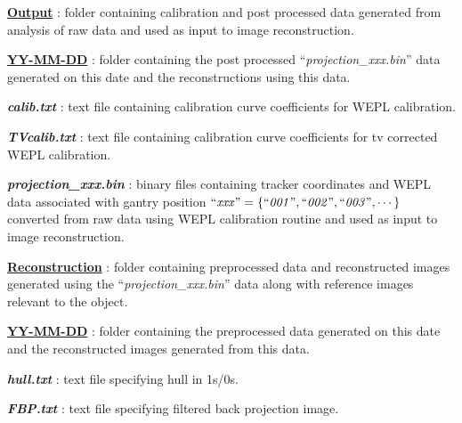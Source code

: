 \documentclass[landscape]{article}
\begin{document}
\begin{myEnumerate}[labelindent=0pt, leftmargin=*]
\begin{myEnumerate}[labelindent=1pt, leftmargin=*]
\begin{myEnumerate}[labelindent=1pt, leftmargin=*]
\begin{myEnumerate}[labelindent=1pt, leftmargin=*]
\begin{myEnumerate}[labelindent=1pt, leftmargin=*]
\begin{myEnumerate}[labelindent=1pt, leftmargin=*]
                    \end{myEnumerate}
                    \item \ul{\textbf{Output}} : folder containing calibration and post processed data generated from analysis of raw data and used as input to image reconstruction.
                    \begin{myEnumerate}[labelindent=1pt, leftmargin=*]
                        \item \ul{\textbf{YY-MM-DD}} : folder containing the post processed ``\textit{projection\_xxx.bin}'' data generated on this date and the reconstructions using this data.
                        \begin{myEnumerate}[labelindent=1pt, leftmargin=*]
                            \item \textbf{\textit{calib.txt}} : text file containing calibration curve coefficients for WEPL calibration.
                            \item \textbf{\textit{TVcalib.txt}} : text file containing calibration curve coefficients for tv corrected WEPL calibration.
                            \item \textbf{\textit{projection\_xxx.bin}} : binary files containing tracker coordinates and WEPL data associated with gantry position $\textrm{``\textit{xxx}''} =\{\textrm{``\textit{001}''}, \textrm{``\textit{002}''}, \textrm{``\textit{003}''}, \cdots\}$ converted from raw data using WEPL calibration routine and used as input to image reconstruction.
                            \item \ul{\textbf{Reconstruction}} : folder containing preprocessed data and reconstructed images generated using the ``\textit{projection\_xxx.bin}'' data along with reference images relevant to the object.
                            \begin{myEnumerate}[labelindent=1pt, leftmargin=*]
                                \item \ul{\textbf{YY-MM-DD}} : folder containing the preprocessed data generated on this date and the reconstructed images generated from this data.
                                \begin{myEnumerate}[labelindent=1pt, leftmargin=*]
                                    \item \textbf{\textit{hull.txt}} : text file specifying hull in 1s/0s.
                                    \item \textbf{\textit{FBP.txt}} : text file specifying filtered back projection image.

\end{myEnumerate}
\end{myEnumerate}
\end{myEnumerate}
\end{myEnumerate}
\end{myEnumerate}
\end{myEnumerate}
\end{myEnumerate}
\end{myEnumerate}
\end{myEnumerate}
\end{document}
